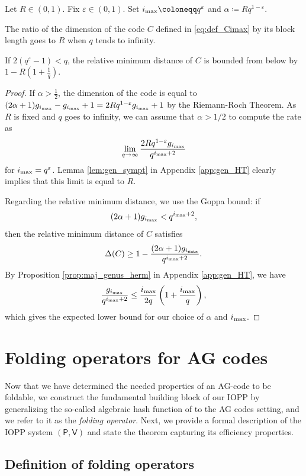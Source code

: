 \documentclass[a4paper,USenglish,autoref]{lipics-v2021}
\renewcommand\epsilon{\varepsilon}
\newcommand\prover{\mathsf{P}}
\newcommand\verifier{\mathsf{V}}
\newcommand\mydef{\coloneqq}
\newcommand{\ii}{i_{\rm{max}}}
\begin{document}
\begin{lemma}\label{lem:limit-rate}
	Let $R \in (0,1)$. Fix $\epsilon \in (0,1)$. Set $\ii\mydef q^\epsilon$ and $\alpha \mydef R q^{1-\epsilon}$.
	
	The ratio of the dimension of the code $C$ defined in \eqref{eq:def_Cimax} by its block length goes to $R$ when $q$ tends to infinity. 
	
	If $2(q^\epsilon-1)<q$, the relative minimum distance of $C$ is bounded from below by $1-R\left(1+\frac{1}{q}\right)$.
\end{lemma}

\begin{proof}
	If $\alpha > \frac{1}{2}$, the dimension of the code is equal to $(2\alpha +1)g_{\ii}- g_{\ii}+1= 2Rq^{1-\epsilon}g_{\ii}+1$ by the Riemann-Roch Theorem. As $R$ is fixed and $q$ goes to infinity, we can assume that $\alpha > 1/2$ to compute the rate as
	\[\lim_{q \rightarrow \infty} \frac{2Rq^{1-\epsilon}g_{\ii}}{q^{\ii+2}}\]
	for $\ii=q^\epsilon$.
	Lemma \ref{lem:gen_sympt} in Appendix \ref{app:gen_HT} clearly implies that this limit is equal to $R$.
	
	Regarding the relative minimum distance, we use the Goppa bound: if \[(2\alpha + 1)g_{\ii} < q^{\ii+2},\] then the relative minimum distance of $C$ satisfies \[\Delta(C) \geq 1 - \frac{(2\alpha + 1)g_{\ii}}{q^{\ii+2}}.\] By Proposition \ref{prop:maj_genus_herm} in Appendix \ref{app:gen_HT}, we have
	\[ \frac{g_{\ii}}{q^{\ii+2}} \leq \frac{\ii}{2q}\left(1 + \frac{\ii}{q}\right),\]
	which gives the expected lower bound for our choice of $\alpha$ and $\ii$.
\end{proof}


\section{Folding operators for AG codes}\label{sec:iopp}

Now that we have determined the needed properties of an AG-code to be foldable, we construct the fundamental building block of our IOPP by generalizing the so-called algebraic hash function of \cite{BKS18} to the AG codes setting, and we refer to it as the \emph{folding operator}. Next, we provide a formal description of the IOPP system $(\prover, \verifier)$ and state the theorem capturing its efficiency properties.

\subsection{Definition of folding operators}\label{subsec:folding}
\end{document}
